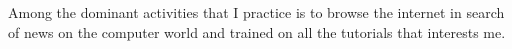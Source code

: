 \documentclass[10pt,A4]{article}
\begin{document}
\begin{minipage}{0.59\textwidth}
{		%
		\parbox[b][3cm][c]{3.5cm}{
			\begin{center}
			\textcolor{textcol}{Among the dominant activities that I practice is to browse the internet in search of news on the computer world and trained on all the tutorials that interests me.}
			\end{center}
		}
	}

\end{minipage}
\hspace{5pt}
\begin{minipage}{0.01\textwidth}
	\begin{center}
	\end{center}
\end{minipage}
\end{document}
